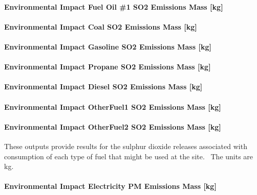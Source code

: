 \paragraph{Environmental Impact Fuel Oil \#1 SO2 Emissions Mass {[}kg{]}}\label{environmental-impact-fuel-oil-1-so2-emissions-mass-kg}

\paragraph{Environmental Impact Coal SO2 Emissions Mass {[}kg{]}}\label{environmental-impact-coal-so2-emissions-mass-kg}

\paragraph{Environmental Impact Gasoline SO2 Emissions Mass {[}kg{]}}\label{environmental-impact-gasoline-so2-emissions-mass-kg}

\paragraph{Environmental Impact Propane SO2 Emissions Mass {[}kg{]}}\label{environmental-impact-propane-so2-emissions-mass-kg}

\paragraph{Environmental Impact Diesel SO2 Emissions Mass {[}kg{]}}\label{environmental-impact-diesel-so2-emissions-mass-kg}

\paragraph{Environmental Impact OtherFuel1 SO2 Emissions Mass {[}kg{]}}\label{environmental-impact-otherfuel1-so2-emissions-mass-kg}

\paragraph{Environmental Impact OtherFuel2 SO2 Emissions Mass {[}kg{]}}\label{environmental-impact-otherfuel2-so2-emissions-mass-kg}

These outputs provide results for the sulphur dioxide releases associated with consumption of each type of fuel that might be used at the site.~ The units are kg.

\paragraph{Environmental Impact Electricity PM Emissions Mass {[}kg{]}}\label{environmental-impact-electricity-pm-emissions-mass-kg}

